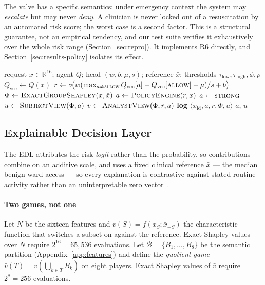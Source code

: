 \documentclass[conference]{IEEEtran}
\newcommand{\allow}{\textsc{allow}}
\newcommand{\strongauth}{\textsc{strong}}
\newcommand{\deny}{\textsc{deny}}
\begin{document}
The valve has a specific semantics: under emergency context the system may
\emph{escalate} but may never \emph{deny}. A clinician is never locked out of a
resuscitation by an automated risk score; the worst case is a second factor.
This is a structural guarantee, not an empirical tendency, and our test suite
verifies it exhaustively over the whole risk range
(Section~\ref{sec:repro}). It implements R6 directly, and
Section~\ref{sec:results-policy} isolates its effect.

\begin{algorithm}[t]
\caption{HEAAF decision cycle at one epoch}
\label{alg:cycle}
\begin{algorithmic}[1]
\Require request $x\in\mathbb{R}^{16}$; agent $Q$; head $(w,b,\mu,s)$;
         reference $\bar{x}$; thresholds $\tau_{\text{low}},\tau_{\text{high}},\phi,\rho$
\State $Q_{\text{vec}} \gets Q(x)$ 
\State $r \gets \sigma\!\big(w(\max_{a\neq \allow}Q_{\text{vec}}[a]-Q_{\text{vec}}[\allow]-\mu)/s + b\big)$
\State $\Phi \gets \textsc{ExactGroupShapley}(x,\bar{x})$
\State $a \gets \textsc{PolicyEngine}(r, x)$ 
\If{$E(x)$ \textbf{and} $a = \deny$} $a \gets \strongauth$
        \EndIf
\State $u \gets \textsc{SubjectView}(\Phi, a)$
\State $v \gets \textsc{AnalystView}(\Phi, r, a)$ 
\State \textbf{log} $\langle x_{\text{id}}, a, r, \Phi, u\rangle$ 
\State \Return $a$, $u$
\end{algorithmic}
\end{algorithm}

\subsection{Explainable Decision Layer}
\label{sec:edl}

The EDL attributes the risk \emph{logit} rather than the probability, so
contributions combine on an additive scale, and uses a fixed clinical reference
$\bar{x}$ --- the median benign ward access --- so every explanation is
contrastive against stated routine activity rather than an uninterpretable zero
vector~\cite{aas2021}.

\paragraph{Two games, not one}
Let $N$ be the sixteen features and $v(S)=f(x_S;\bar{x}_{-S})$ the
characteristic function that switches a subset on against the reference. Exact
Shapley values over $N$ require $2^{16}=65{,}536$ evaluations. Let
$\mathcal{B}=\{B_1,\dots,B_8\}$ be the semantic partition
(Appendix~\ref{app:features}) and define the \emph{quotient game}
$\bar v(T) = v\!\left(\bigcup_{k\in T} B_k\right)$ on eight players. Exact
Shapley values of $\bar v$ require $2^{8}=256$ evaluations.
\end{document}
